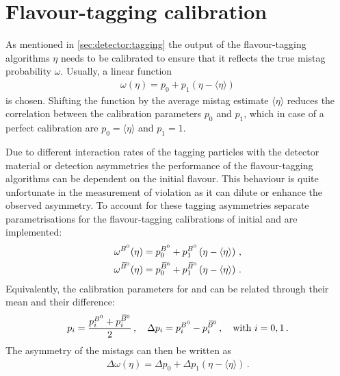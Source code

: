 
\section{Flavour-tagging calibration}
\label{sec:dataanalysis:taggingcalibration}

As mentioned in \cref{sec:detector:tagging} the output of the
flavour-tagging algorithms $\eta$ needs to be calibrated to ensure that it
reflects the true mistag probability $\omega$. Usually, a linear function
\begin{align}
	\omega(\eta) = p_0 + p_1 (\eta - \langle\eta\rangle)
\label{eq:dataanalysis:taggingcalibration:generalfunction}
\end{align}
is chosen. Shifting the function by the average mistag estimate
$\langle\eta\rangle$ reduces the correlation between the calibration
parameters $p_0$ and $p_1$, which in case of a perfect calibration are
$p_0 = \langle\eta\rangle$ and $p_1 = 1$.

Due to different interaction rates of the tagging particles with the detector
material or detection asymmetries the performance of the flavour-tagging
algorithms can be dependent on the initial flavour. This behaviour is quite
unfortunate in the measurement of \CP violation as it can dilute or enhance
the observed asymmetry. To account for these tagging asymmetries separate
parametrisations for the flavour-tagging calibrations of initial \Bd and \Bzb
are implemented:
\begin{equation}
\begin{split}
  \omega^{{{B}^0} }(\eta) = p_0^{{{B}^0} } + p_1^{{{B}^0} }\left(\eta - \langle\eta\rangle\right) \, , \\
  \omega^{{{\kern 0.18em\overline{\kern -0.18em B}{}}{}^0}}(\eta) = p_0^{{{\kern 0.18em\overline{\kern -0.18em B}{}}{}^0}} + p_1^{{{\kern 0.18em\overline{\kern -0.18em B}{}}{}^0}}\left(\eta - \langle\eta\rangle\right) \, .
\end{split}
\label{eq:dataanalysis:taggingcalibration:individual_parametrisations}
\end{equation}
Equivalently, the calibration parameters for \Bd and \Bzb can be related
through their mean and their difference:
\begin{equation}
  p_i        = \frac{p_i^{{{B}^0} } + p_i^{{{\kern 0.18em\overline{\kern -0.18em B}{}}{}^0}}}{2} \, , \quad
  \Delta p_i = p_i^{{{B}^0} } - p_i^{{{\kern 0.18em\overline{\kern -0.18em B}{}}{}^0}} \, , \quad
  \text{with }i = 0,1 \,.
\label{eq:dataanalysis:taggingcalibration:individual_pis}
\end{equation}
The asymmetry of the mistags can then be written as
\begin{align}
	\Delta\omega(\eta) = \Delta p_0 + \Delta p_1 (\eta - \langle\eta\rangle)\,.
\label{eq:dataanalysis:taggingcalibration:mistagasymmetry}
\end{align}

